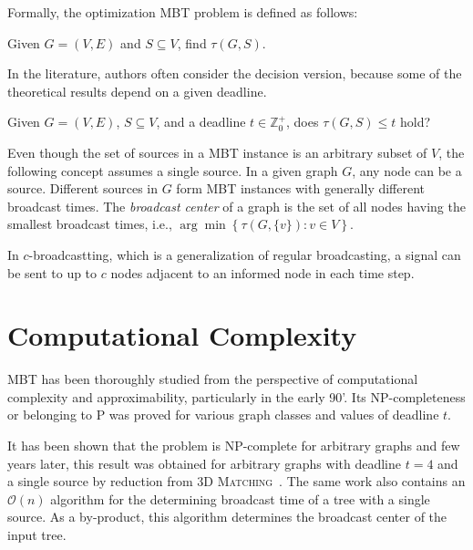 Formally, the optimization MBT problem is defined as follows:
\begin{problem}\label{mbt:opt}
Given $G=(V,E)$ and $S\subseteq V$, find $\tau(G,S)$. 
\end{problem}
In the literature, authors often consider the decision version, because some of the theoretical results depend on a given deadline.
\begin{problem}\label{mbt:dec}
Given $G=(V,E)$, $S\subseteq V$,  and a deadline $t\in \mathbb{Z}^+_0$, does $\tau(G,S)\leq t$ hold? 
\end{problem}

Even though the set of sources in a MBT instance is an arbitrary subset of $V$, the following concept assumes a single source.
In a given graph $G$, any node can be a source.
Different sources in $G$ form MBT instances with generally different broadcast times.
The \emph{broadcast center} of a graph is the set of all nodes having the smallest broadcast times, i.e., $\arg\min\left\{\tau(G,\{v\}):v\in V\right\}$.

In $c$-broadcastting, which is a generalization of regular broadcasting, a signal can be sent to up to $c$ nodes adjacent to an informed node in each time step.


\section{Computational Complexity}

MBT has been thoroughly studied from the perspective of computational complexity and approximability, particularly in the early 90'.
Its NP-completeness or belonging to P was proved for various graph classes and values of deadline $t$.

It has been shown that the problem is NP-complete for arbitrary graphs \cite{garey79} and few years later, 
this result was obtained for arbitrary graphs with deadline $t=4$ and a single source by reduction from \textsc{3D Matching}~\cite{slater81}. 
The same work also contains an $\mathcal{O}(n)$ algorithm for the determining broadcast time of a tree with a single source. 
As a by-product, this algorithm determines the broadcast center of the input tree.

